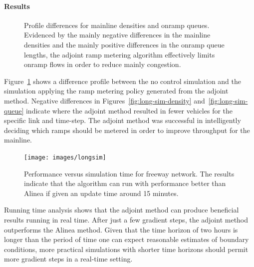 \paragraph{Results}

\begin{figure}
\hfill{}

\caption{Profile differences for mainline densities and onramp queues. Evidenced
by the mainly negative differences in the mainline densities and the
mainly positive differences in the onramp queue lengths, the adjoint
ramp metering algorithm effectively limits onramp flows in order to
reduce mainly congestion.\label{fig:long-sim}}
\end{figure}


Figure~\ref{fig:long-sim} shows a difference profile between the
no control simulation and the simulation applying the ramp metering
policy generated from the adjoint method. Negative differences in
Figures~\ref{fig:long-sim-density} and~\ref{fig:long-sim-queue}
indicate where the adjoint method resulted in fewer vehicles for the
specific link and time-step. The adjoint method was successful in
intelligently deciding which ramps should be metered in order to improve
throughput for the mainline.
\begin{figure}
\begin{centering}
\texttt{[image: images/longsim]}
\par\end{centering}

\caption{Performance versus simulation time for freeway network. The results
indicate that the algorithm can run with performance better than Alinea
if given an update time around 15 minutes.}
\end{figure}


Running time analysis shows that the adjoint method can produce beneficial
results running in real time. After just a few gradient steps, the
adjoint method outperforms the Alinea method. Given that the time
horizon of two hours is longer than the period of time one can expect
reasonable estimates of boundary conditions, more practical simulations
with shorter time horizons should permit more gradient steps in a
real-time setting.

